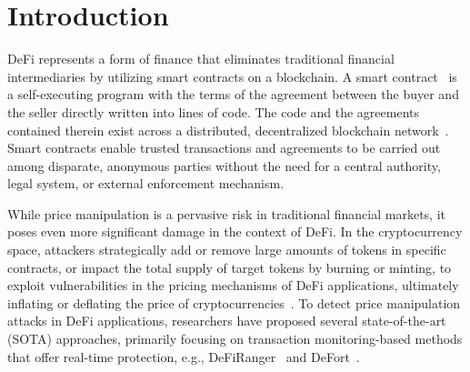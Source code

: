 \section{Introduction}
\label{sec:introduction}

DeFi represents a form of finance that eliminates traditional financial intermediaries by utilizing smart contracts on a blockchain.
A smart contract~\cite{zou2019smart} is a self-executing program with the terms of the agreement between the buyer and the seller directly written into lines of code.
The code and the agreements contained therein exist across a distributed, decentralized blockchain network~\cite{dinh2018untangling}.
Smart contracts enable trusted transactions and agreements to be carried out among disparate, anonymous parties without the need for a central authority, legal system, or external enforcement mechanism.

While price manipulation is a pervasive risk in traditional financial markets, it poses even more significant damage in the context of DeFi.
In the cryptocurrency space, attackers strategically add or remove large amounts of tokens in specific contracts, or impact the total supply of target tokens by burning or minting, to exploit vulnerabilities in the pricing mechanisms of DeFi applications, ultimately inflating or deflating the price of cryptocurrencies~\cite{cointelegraph}.
To detect price manipulation attacks in DeFi applications, researchers have proposed several state-of-the-art (SOTA) approaches, primarily focusing on transaction monitoring-based methods that offer real-time protection, e.g., DeFiRanger~\cite{DeFiRanger23} and DeFort~\cite{DeFort24}.


